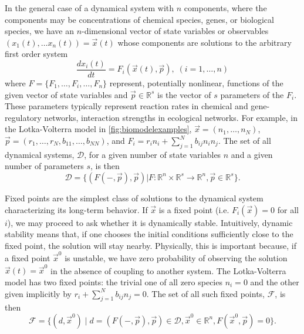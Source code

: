 
In the general case of a dynamical system with $n$ components, where the components may be concentrations of chemical species, genes, or biological species, we have an $n$-dimensional vector of state variables or observables $(x_1(t), \ldots x_n(t)) = \vec{x}(t)
$
whose components are solutions to the arbitrary first order system
\begin{equation}\label{eq:eom}
\frac{dx_i(t)}{dt} = F_i(\vec{x}(t), \vec{p}), \; (i=1,\ldots,n)
\end{equation}
where $F=\{F_1,\ldots,F_i,\ldots,F_n\}$ represent, potentially nonlinear, functions of the given vector of state variables and $\vec{p} \in \mathbb{R}^s$ is the vector of $s$ parameters of the $F_i$. These parameters typically represent reaction rates in chemical and gene-regulatory networks, interaction strengths in ecological networks. For example, in the Lotka-Volterra model in \ref{fig:biomodelexamples}, $\vec{x} = (n_1, \ldots, n_N)$, $\vec{p}=(r_1,\ldots,r_N,b_{11},\ldots,b_{NN})$, and $F_i = r_i n_i + \sum_{j=1}^{N} b_{ij} n_i n_j$. The set of all dynamical systems, $\mathcal{D}$, for a given number of state variables $n$ and a given number of parameters $s$, is then
\begin{equation}\label{eq:setdynsys}
\mathcal{D} = \{ (F(-,\vec{p}),\vec{p}) | F \colon \mathbb{R}^n \times \mathbb{R}^s \rightarrow \mathbb{R}^n, \vec{p} \in \mathbb{R}^s \}.
\end{equation}

Fixed points are the simplest class of solutions to the dynamical system characterizing its long-term behavior. If $\vec x$ is a fixed point (i.e. $F_i(\vec{x})=0$ for all $i$), we
may proceed to ask whether it is dynamically stable.
Intuitively, dynamic stability means that, if one chooses the initial
conditions sufficiently close to the fixed point, the solution will
stay nearby.  Physically, this is important because,
if a fixed point ${\vec x}^0$ is unstable, we have zero probability of
observing the solution ${\vec x}(t) = {\vec x}^0$ in the absence of coupling to another system. The Lotka-Volterra model has two fixed points: the trivial one of all zero species $n_i=0$ and the other given implicitly by $r_i + \sum_{j=1}^{N} b_{ij} n_j = 0$. The set of all such fixed points, $\mathcal{F}$, is then
\begin{equation}\label{eq:setfixedpoints}
\mathcal{F} = \{ (d,\vec{x}^0) \; | \; d=(F(-,\vec{p}),\vec{p}) \in \mathcal{D}, \vec{x}^0 \in \mathbb{R}^n,F(\vec{x}^0,\vec{p})=0 \}.
\end{equation}

